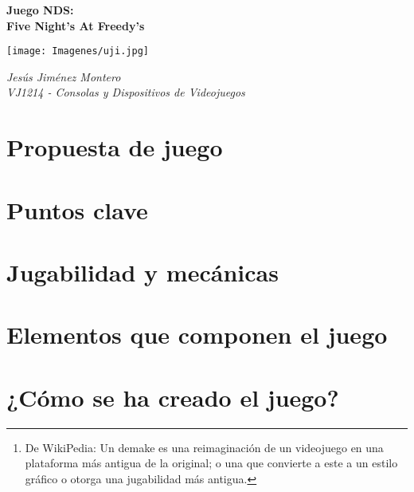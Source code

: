 \documentclass[12pt]{article}
\begin{document}
\nocite{namesans_about}
\nocite{namesans}
\nocite{namemono}


	\begin{titlepage}
		\begin{center}
			{\Huge \textbf{Juego NDS: \\
			Five Night's At Freedy's}}

			\vspace{2cm}

			\texttt{[image: Imagenes/uji.jpg]}

			\vspace{2cm}

			{\Large \textit{Jesús Jiménez Montero}}\\
			\vspace{1cm}
			{\Large \textit{VJ1214 - Consolas y Dispositivos de Videojuegos}}\\

			\vspace{2cm}
		\end{center}
	\end{titlepage}

	\newpage
	\renewcommand{\contentsname}{Tabla de contenidos}
	\setcounter{secnumdepth}{5}
	\tableofcontents
	\setcounter{tocdepth}{4}
	\newpage

\begin{abstract}
	Este juego es un \textit{"demake"} \footnote{De WikiPedia: Un demake es una reimaginación de un videojuego en una plataforma más antigua de la original; o una que convierte a este a un estilo gráfico o otorga una jugabilidad más antigua.} del popular juego de PC: \textit{Five Night's At Freedy's}.
\end{abstract}

\section{Propuesta de juego}

	

\section{Puntos clave}
\section{Jugabilidad y mecánicas}
\section{Elementos que componen el juego}
\section{¿Cómo se ha creado el juego?}

\newpage

\printbibliography[title={Bibliografía y agradecimientos}]
\end{document}
